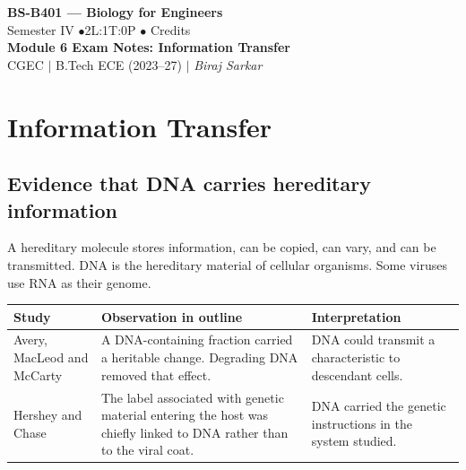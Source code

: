 \documentclass[12pt,a4paper]{article}
\begin{document}
\begin{center}
  {\LARGE\bfseries\color{myred} BS-B401 --- Biology for Engineers}\\[5pt]
  {\normalsize\color{mydark} Semester IV \quad$\bullet$\quad 2L:1T:0P \quad$\bullet$ Credits}\\[3pt]
  {\normalsize\color{myteal}\textbf{Module 6 Exam Notes: Information Transfer}}\\[3pt]
  {\small\color{mydark} CGEC \;$|$\; B.Tech ECE (2023--27) \;$|$\; \textit{Biraj Sarkar}}
\end{center}
\vspace{2pt}
\noindent{\color{myred}\rule{\linewidth}{1.5pt}}
\vspace{2pt}

\hypersetup{linkcolor=mydark}
\tableofcontents
\hypersetup{linkcolor=myteal}
\newpage

\section{Information Transfer}
\subsection{Evidence that DNA carries hereditary information}
\begin{tcolorbox}[defbox, title={Hereditary material}]
A hereditary molecule stores information, can be copied, can vary, and can be transmitted. DNA is the hereditary material of cellular organisms. Some viruses use RNA as their genome.
\end{tcolorbox}

\par\vspace{5pt}
\begingroup
\setlength{\extrarowheight}{1pt}
\noindent\begin{tabularx}{\linewidth}{|B{3.5cm}|Y|Y|}
\hline
\textbf{Study} & \textbf{Observation in outline} & \textbf{Interpretation} \\ \hline
Avery, MacLeod and McCarty & A DNA-containing fraction carried a heritable change. Degrading DNA removed that effect. & DNA could transmit a characteristic to descendant cells. \\ \hline
Hershey and Chase & The label associated with genetic material entering the host was chiefly linked to DNA rather than to the viral coat. & DNA carried the genetic instructions in the system studied. \\ \hline
\end{tabularx}\par
\endgroup
\end{document}

